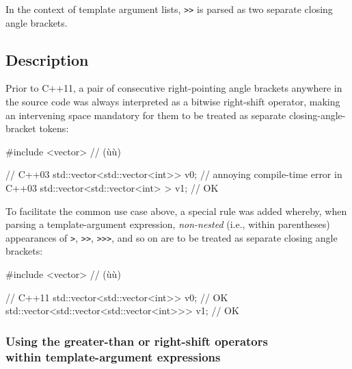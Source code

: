 
In the context of template argument lists, \lstinline!>>! is parsed as two
separate closing angle brackets.

\subsection[Description]{Description}\label{description}

Prior to C++11, a pair of consecutive right-pointing angle brackets anywhere in
the source code was always interpreted as a bitwise right-shift
operator, making an intervening space mandatory for them to be treated
as separate closing-angle-bracket tokens:

\begin{emcppshiddenlisting}[emcppsbatch=e1]
#include <vector>  // (ù{}ù)
\end{emcppshiddenlisting}
\begin{emcppslisting}[emcppsbatch=e1]
// C++03
std::vector<std::vector<int>> v0;   // annoying compile-time error in C++03
std::vector<std::vector<int> > v1;  // OK
\end{emcppslisting}

\noindent To facilitate the common use case above, a special rule was added
whereby, when parsing a template-argument expression, \emph{non-nested}
(i.e., within parentheses) appearances of \lstinline!>!, \lstinline!>>!,
\lstinline!>>>!, and so on are to be treated as separate closing angle brackets:

\begin{emcppshiddenlisting}[emcppsbatch=e2]
#include <vector>  // (ù{}ù)
\end{emcppshiddenlisting}
\begin{emcppslisting}[emcppsbatch=e2]
// C++11
std::vector<std::vector<int>> v0;               // OK
std::vector<std::vector<std::vector<int>>> v1;  // OK
\end{emcppslisting}

\subsubsection[Using the greater-than or right-shift operators within template-argument expressions]{Using the greater-than or right-shift operators\\[0.5ex] within template-argument expressions}\label{using-the-greater-than-or-right-shift-operators-within-template-argument-expressions}

